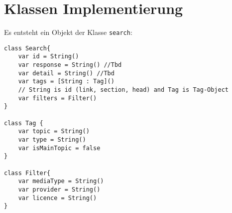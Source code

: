 \section{Klassen Implementierung}
Es entsteht ein Objekt der Klasse \Verb|search|:

\begin{lstlisting}
class Search{
    var id = String()
    var response = String() //Tbd
    var detail = String() //Tbd
    var tags = [String : Tag]()
    // String is id (link, section, head) and Tag is Tag-Object
    var filters = Filter()
}

class Tag {
    var topic = String()
    var type = String()
    var isMainTopic = false
}

class Filter{
    var mediaType = String()
    var provider = String()
    var licence = String()
}
\end{lstlisting}